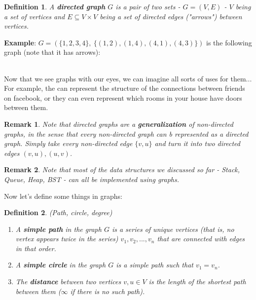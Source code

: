 \documentclass[12pt]{article}
\newtheorem{definition}{Definition} \newtheorem{remark}{Remark}
\begin{document}
\begin{definition}
A \textbf{directed graph} $G$ is a pair of two sets - $G=(V, E)$ - $V$ being a set of vertices and $E\subseteq V\times V$ being a set of directed edges ("arrows") between vertices.
\end{definition}

\textbf{Example}: $G=(\{1,2,3,4\},\ \{(1, 2), (1, 4), (4, 1), (4,3)\})$ is the following graph (note that it has arrows): \\ \\

Now that we see graphs with our eyes, we can imagine all sorts of uses for them... For example, the can represent the structure of the connections between friends on facebook, or they can even represent which rooms in your house have doors between them.

\begin{remark}
Note that directed graphs are a \textbf{generalization} of non-directed graphs, in the sense that every non-directed graph can b represented as a directed graph. Simply take every non-directed edge $\{v,u\}$ and turn it into two directed edges $(v,u), (u,v)$. 
\end{remark}

\begin{remark}
Note that most of the data structures we discussed so far - Stack, Queue, Heap, BST - can all be implemented using graphs.
\end{remark}

Now let's define some things in graphs:

\begin{definition} (Path, circle, degree)
\begin{enumerate} 
\item A \textbf{simple path} in the graph $G$ is a series of unique vertices (that is, no vertex appears twice in the series) $v_1, v_2, ..., v_n$ that are connected with edges in that order. 
\item A \textbf{simple circle} in the graph $G$ is a simple path such that $v_1 = v_n$. 
\item The \textbf{distance} between two vertices $v,u\in V$ is the length of the shortest path between them ($\infty$ if there is no such path).
\end{enumerate}
\end{definition}
\end{document}
